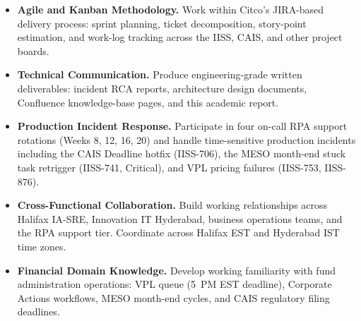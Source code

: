 \begin{itemize}
    \item \textbf{Agile and Kanban Methodology.}
          Work within Citco's JIRA-based delivery process: sprint planning,
          ticket decomposition, story-point estimation, and work-log
          tracking across the IISS, CAIS, and other project boards.

    \item \textbf{Technical Communication.}
          Produce engineering-grade written deliverables: incident RCA
          reports, architecture design documents, Confluence knowledge-base
          pages, and this academic report.

    \item \textbf{Production Incident Response.}
          Participate in four on-call RPA support rotations (Weeks 8, 12,
          16, 20) and handle time-sensitive production incidents including
          the CAIS Deadline hotfix (IISS-706), the MESO month-end stuck
          task retrigger (IISS-741, Critical), and VPL pricing failures
          (IISS-753, IISS-876).

    \item \textbf{Cross-Functional Collaboration.}
          Build working relationships across Halifax IA-SRE, Innovation IT
          Hyderabad, business operations teams, and the RPA support tier.
          Coordinate across Halifax EST and Hyderabad IST time zones.

    \item \textbf{Financial Domain Knowledge.}
          Develop working familiarity with fund administration operations:
          VPL queue (5~PM EST deadline), Corporate Actions workflows, MESO
          month-end cycles, and CAIS regulatory filing deadlines.
\end{itemize}
